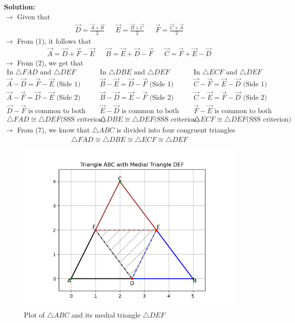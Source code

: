 \documentclass[journal]{IEEEtran}
\begin{document}
\textbf{Solution:}\\
$\rightarrow$ Given that
\begin{align}
    \vec{D} = \frac{\vec{A}+\vec{B}}{2} && \vec{E} = \frac{\vec{B}+\vec{C}}{2} && \vec{F} = \frac{\vec{C}+\vec{A}}{2}
\end{align}
$\rightarrow$ From (1), it follows that
\begin{align}
    \vec{A} = \vec{D}+\vec{F}-\vec{E} && \vec{B} = \vec{E}+\vec{D}-\vec{F} && \vec{C} = \vec{F}+\vec{E}-\vec{D}
\end{align}
$\rightarrow$ From (2), we get that
\begin{align}
    \text{In }\triangle FAD\text{ and }\triangle DEF && \text{In }\triangle DBE\text{ and }\triangle DEF && \text{In }\triangle ECF\text{ and }\triangle DEF \\
    \vec{A}-\vec{D} = \vec{F}-\vec{E}\text{ (Side 1)} && \vec{B}-\vec{E} = \vec{D}-\vec{F}\text{ (Side 1)} && \vec{C}-\vec{F} = \vec{E}-\vec{D}\text{ (Side 1)} \\
    \vec{A}-\vec{F} = \vec{D}-\vec{E}\text{ (Side 2)} && \vec{B}-\vec{D} = \vec{E}-\vec{F}\text{ (Side 2)} && \vec{C}-\vec{E} = \vec{F}-\vec{D}\text{ (Side 2)} \\
    \vec{D}-\vec{F}\text{ is common to both} && \vec{E}-\vec{D}\text{ is common to both} && \vec{F}-\vec{E}\text{ is common to both} \\
    \triangle FAD \cong \triangle DEF\text{(SSS criterion)} && \triangle DBE \cong \triangle DEF\text{(SSS criterion)} &&
    \triangle ECF \cong \triangle DEF\text{(SSS criterion)}
\end{align}
$\rightarrow$ From (7), we know that $\triangle ABC$ is divided into four congruent triangles
\begin{align}
    \triangle FAD \cong \triangle DBE \cong \triangle ECF \cong \triangle DEF
\end{align}
\begin{figure}[h!]
   \centering
   \includegraphics[width=\linewidth]{figs/01.png}
   \caption{Plot of $\triangle ABC$ and its medial triangle $\triangle DEF$}
   \label{Plot_1}
\end{figure}
\end{document}

